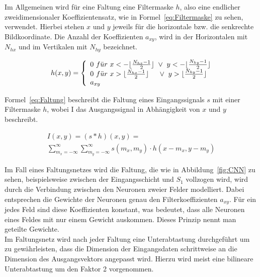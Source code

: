 \documentclass[times, 12pt,twocolumn]{article}
\begin{document}
Im Allgemeinen wird für eine Faltung eine Filtermaske $h$, also eine endlicher zweidimensionaler Koeffizientensatz, wie in Formel~\ref{eq:Filtermaske} zu sehen, verwendet. Hierbei stehen $x$ und $y$ jeweils für die horizontale bzw. die senkrechte Bildkoordinate. Die Anzahl der Koeffizienten $a_{xy}$, wird in der Horizontalen mit $N_{hx}$ und im Vertikalen mit $N_{hy}$ bezeichnet. 

\footnotesize
\begin{equation} 
	h(x,y) = \left\lbrace
  \begin{array}{l@{}l}
   0~f\ddot{u}r~x<-\lfloor\frac{N_{hx}-1}{2}\rfloor~\vee~y<-\lfloor\frac{N_{hy}-1}{2}\rfloor\\
    0~f\ddot{u}r~x>\lfloor\frac{N_{hx}-1}{2}\rfloor~~~~\vee~y>\lfloor\frac{N_{hy}-1}{2}\rfloor \\
    a_{xy}
  \end{array}
  \right.	
	\label{eq:Filtermaske}
\end{equation}
\small  

Formel~\ref{eq:Faltung} beschreibt die Faltung eines Eingangssignals $s$ mit einer Filtermaske $h$, wobei I das Ausgangssignal in Abhängigkeit von $x$ und $y$ beschreibt.

\footnotesize
\begin{equation}
\begin{aligned}
I(x,y) = (s*h)(x,y) = \\
\sum_{m_x=-\infty}^\infty \sum_{m_y=-\infty}^\infty s(m_x,m_y) \cdot h(x-m_x,y-m_y) 
\end{aligned}
	\label{eq:Faltung}
\end{equation}
\small

Im Fall eines Faltungsnetzes wird die Faltung, die wie in Abbildung~\ref{fig:CNN} zu sehen, beispielsweise zwischen der Eingangsschicht und $S_1$ vollzogen wird, wird durch die Verbindung zwischen den Neuronen zweier Felder modelliert. Dabei entsprechen die Gewichte der Neuronen genau den Filterkoeffizienten $a_{xy}$. Für ein jedes Feld sind diese Koeffizienten konstant, was bedeutet, dass alle Neuronen eines Feldes mit nur einem Gewicht auskommen. Dieses Prinzip nennt man geteilte Gewichte. \\

Im Faltungsnetz wird nach jeder Faltung eine Unterabtastung durchgeführt um zu gewährleisten, dass die Dimension der Eingangsdaten schrittweise an die Dimension des Ausgangsvektors angepasst wird. Hierzu wird meist eine bilineare Unterabtastung um den Faktor 2 vorgenommen. \\
\end{document}
